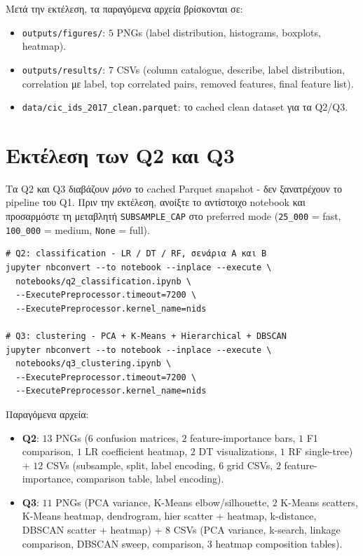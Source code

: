 \documentclass[12pt,a4paper,twoside]{book}
\begin{document}
Μετά την εκτέλεση, τα παραγόμενα αρχεία βρίσκονται σε:

\begin{itemize}
    \item \texttt{outputs/figures/}: \(5\) PNGs (label distribution,
    histograms, boxplots, heatmap).
    \item \texttt{outputs/results/}: \(7\) CSVs (column catalogue,
    describe, label distribution, correlation με label, top correlated
    pairs, removed features, final feature list).
    \item \texttt{data/cic\_ids\_2017\_clean.parquet}: το cached clean
    dataset για τα Q2/Q3.
\end{itemize}

\section{Εκτέλεση των Q2 και Q3}

Τα Q2 και Q3 διαβάζουν \emph{μόνο} το cached Parquet snapshot - δεν
ξανατρέχουν το pipeline του Q1. Πριν την εκτέλεση, ανοίξτε το αντίστοιχο
notebook και προσαρμόστε τη μεταβλητή \texttt{SUBSAMPLE\_CAP} στο
preferred mode (\texttt{25\_000} = fast, \texttt{100\_000} = medium,
\texttt{None} = full).

\begin{tcolorbox}[myCustomStyle={Run}]
\begin{lstlisting}[style=myBashStyle]
# Q2: classification - LR / DT / RF, σενάρια A και B
jupyter nbconvert --to notebook --inplace --execute \
  notebooks/q2_classification.ipynb \
  --ExecutePreprocessor.timeout=7200 \
  --ExecutePreprocessor.kernel_name=nids

# Q3: clustering - PCA + K-Means + Hierarchical + DBSCAN
jupyter nbconvert --to notebook --inplace --execute \
  notebooks/q3_clustering.ipynb \
  --ExecutePreprocessor.timeout=7200 \
  --ExecutePreprocessor.kernel_name=nids
\end{lstlisting}
\end{tcolorbox}

Παραγόμενα αρχεία:
\begin{itemize}
    \item \textbf{Q2}: \(13\) PNGs (\(6\) confusion matrices, \(2\)
    feature-importance bars, \(1\) F1 comparison, \(1\) LR coefficient
    heatmap, \(2\) DT visualizations, \(1\) RF single-tree) + \(12\)
    CSVs (subsample, split, label encoding, \(6\) grid CSVs, \(2\)
    feature-importance, comparison table, label encoding).
    \item \textbf{Q3}: \(11\) PNGs (PCA variance, K-Means
    elbow/silhouette, \(2\) K-Means scatters, K-Means heatmap,
    dendrogram, hier scatter + heatmap, k-distance, DBSCAN scatter +
    heatmap) + \(8\) CSVs (PCA variance, k-search, linkage comparison,
    DBSCAN sweep, comparison, \(3\) heatmap composition tables).
\end{itemize}
\end{document}
